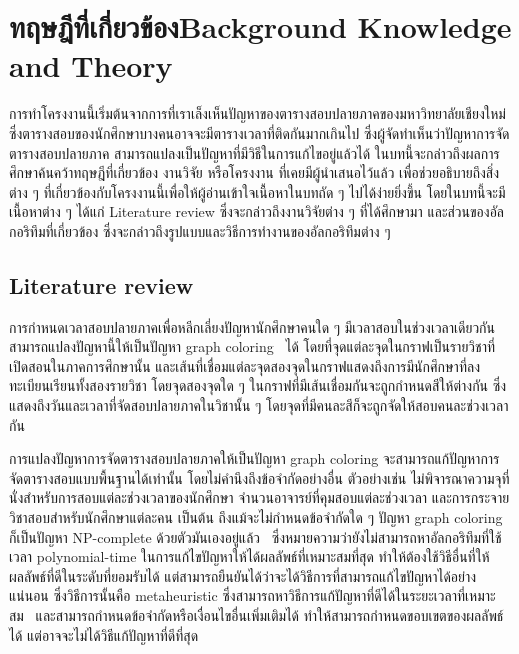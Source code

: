\chapter{\ifcpe ทฤษฎีที่เกี่ยวข้อง\else Background Knowledge and Theory\fi}

การทำโครงงานนี้เริ่มต้นจากการที่เราเล็งเห็นปัญหาของตารางสอบปลายภาคของมหาวิทยาลัยเชียงใหม่ 
ซึ่งตารางสอบของนักศึกษาบางคนอาจจะมีตารางเวลาที่ติดกันมากเกินไป ซึ่งผู้จัดทำเห็นว่าปัญหาการจัดตารางสอบปลายภาค
สามารถแปลงเป็นปัญหาที่มีวิธีในการแก้ไขอยู่แล้วได้ ในบทนี้จะกล่าวถึงผลการศึกษาค้นคว้าทฤษฎีที่เกี่ยวข้อง งานวิจัย หรือโครงงาน ที่เคยมีผู้นำเสนอไว้แล้ว
เพื่อช่วยอธิบายถึงสิ่งต่าง ๆ ที่เกี่ยวข้องกับโครงงานนี้เพื่อให้ผู้อ่านเข้าใจเนื้อหาในบทถัด ๆ ไปได้ง่ายยิ่งขึ้น โดยในบทนี้จะมีเนื้อหาต่าง ๆ ได้แก่ Literature review 
ซึ่งจะกล่าวถึงงานวิจัยต่าง ๆ ที่ได้ศึกษามา และส่วนของอัลกอริทึมที่เกี่ยวข้อง ซึ่งจะกล่าวถึงรูปแบบและวิธีการทำงานของอัลกอริทึมต่าง ๆ 
\section{Literature review}
การกำหนดเวลาสอบปลายภาคเพื่อหลีกเลี่ยงปัญหานักศึกษาคนใด ๆ มีเวลาสอบในช่วงเวลาเดียวกันสามารถแปลงปัญหานี้ให้เป็นปัญหา graph coloring~\cite{mcs} ได้ 
โดยที่จุดแต่ละจุดในกราฟเป็นรายวิชาที่เปิดสอนในภาคการศึกษานั้น 
และเส้นที่เชื่อมแต่ละจุดสองจุดในกราฟแสดงถึงการมีนักศึกษาที่ลงทะเบียนเรียนทั้งสองรายวิชา โดยจุดสองจุดใด ๆ ในกราฟที่มีเส้นเชื่อมกันจะถูกกำหนดสีให้ต่างกัน
ซึ่งแสดงถึงวันและเวลาที่จัดสอบปลายภาคในวิชานั้น ๆ โดยจุดที่มีคนละสีก็จะถูกจัดให้สอบคนละช่วงเวลากัน

การแปลงปัญหาการจัดตารางสอบปลายภาคให้เป็นปัญหา graph coloring จะสามารถแก้ปัญหาการจัดตารางสอบแบบพื้นฐานได้เท่านั้น โดยไม่คำนึงถึงข้อจำกัดอย่างอื่น 
ตัวอย่างเช่น ไม่พิจารณาความจุที่นั่งสำหรับการสอบแต่ละช่วงเวลาของนักศึกษา จำนวนอาจารย์ที่คุมสอบแต่ละช่วงเวลา และการกระจายวิชาสอบสำหรับนักศึกษาแต่ละคน เป็นต้น
ถึงแม้จะไม่กำหนดข้อจำกัดใด ๆ ปัญหา graph coloring ก็เป็นปัญหา NP-complete ด้วยตัวมันเองอยู่แล้ว~\cite{alg-design} 
ซึ่งหมายความว่ายังไม่สามารถหาอัลกอริทึมที่ใช้เวลา polynomial-time ในการแก้ไขปัญหาให้ได้ผลลัพธ์ที่เหมาะสมที่สุด 
ทำให้ต้องใช้วิธีอื่นที่ให้ผลลัพธ์ที่ดีในระดับที่ยอมรับได้ แต่สามารถยืนยันได้ว่าจะได้วิธีการที่สามารถแก้ไขปัญหาได้อย่างแน่นอน 
ซึ่งวิธีการนั้นคือ metaheuristic ซึ่งสามารถหาวิธีการแก้ปัญหาที่ดีได้ในระยะเวลาที่เหมาะสม~\cite{meta-for-vertexcolor}
และสามารถกำหนดข้อจำกัดหรือเงื่อนไขอื่นเพิ่มเติมได้ ทำให้สามารถกำหนดขอบเขตของผลลัพธ์ได้ แต่อาจจะไม่ได้วิธีแก้ปัญหาที่ดีที่สุด


